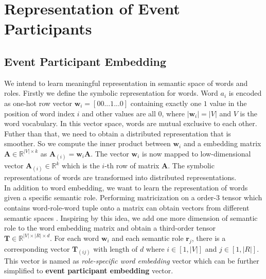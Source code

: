 \documentclass[a4paper]{article}
\begin{document}
\section{Representation of Event Participants}
\subsection{Event Participant Embedding}
We intend to learn meaningful representation in semantic space of words and roles. Firstly we define the symbolic representation for words. Word $a_i$ is encoded as one-hot row vector $\mathbf{w}_i = [00...1...0]$ containing exactly one $1$ value in the position of word index $i$ and other values are all $0$, where $|\mathbf{w}_i| = |V|$ and $V$ is the word vocabulary. In this vector space, words are mutual exclusive to each other.  \\
\noindent
Futher than that, we need to obtain a distributed representation that is smoother. So we compute the inner product between $\mathbf{w}_i$ and a embedding matrix $\mathbf{A} \in \mathbb{R}^{|V| \times k}$ as $\mathbf{A}_{(i)} = \mathbf{w}_i \mathbf{A}$. The vector $\mathbf{w}_i$ is now mapped to low-dimensional vector $\mathbf{A}_{(i)} \in \mathbb{R}^k$ which is the $i$-th row of matrix $\mathbf{A}$. The symbolic representations of words are transformed into distributed representations. \\
\noindent
In addition to word embedding, we want to learn the representation of words given a specific semantic role. Performing matricization on a order-3 tensor which contains word-role-word tuple onto a matrix can obtain vectors from different semantic spaces \citep{baroni2010distributional}. Inspiring by this idea, we add one more dimension of semantic role to the word embedding matrix and obtain a third-order tensor $\mathbf{T} \in \mathbb{R}^{|V| \times |R| \times d}$. For each word $\mathbf{w}_i$ and each semantic role $\mathbf{r}_j$, there is a corresponding vector $\mathbf{T}_{(ij)}$ with length of $d$ where $i \in [1, |V|]$ and $j \in [1, |R|]$. This vector is named as \textit{role-specific word embedding} vector \citep{tilk2016event} which can be further simplified to \textbf{event participant embedding} vector.
\end{document}
